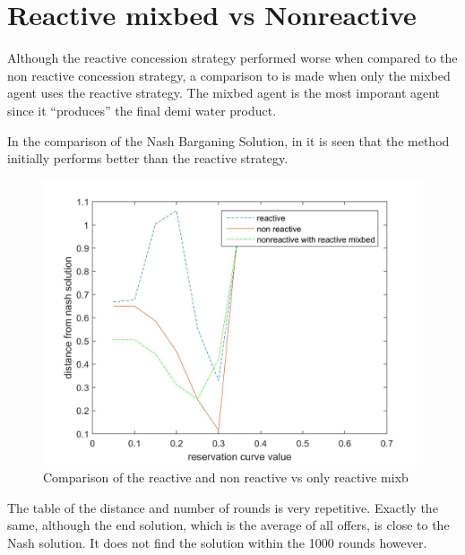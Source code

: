 \section{Reactive mixbed vs Nonreactive }
Although the reactive concession strategy performed worse when compared to the non reactive concession strategy, a comparison to is made when only the mixbed agent uses the reactive strategy. The mixbed agent is the most imporant agent since it ``produces'' the final demi water product.

In the comparison of the Nash Barganing Solution, in  it is seen that the method initially performs better than the reactive strategy. 


\begin{figure}[h]
	\centering
	\includegraphics[width=0.7\linewidth]{img/reactivevsnonreactivevsmixbedrea}
	\caption{Comparison of the reactive and non reactive vs only reactive mixb}
	\label{fig:reactivevsnonreactivevsnonreactivemxbrea}
\end{figure}


The table of the distance and number of rounds is very repetitive. Exactly the same, although the end solution, which is the average of all offers, is close to the Nash solution. It does not find the solution within the 1000 rounds however.

